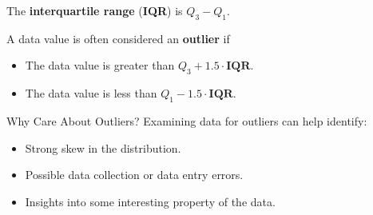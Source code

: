 \documentclass[handout]{beamer}
\begin{document}
\begin{frame}
\begin{definition}
The \textbf{interquartile range} (\textbf{IQR}) is $Q_3-Q_1$.
\end{definition}\pause

\begin{definition}
A data value is often considered an \textbf{outlier} if
\begin{itemize}
\item  The data value is greater than $Q_3 + 1.5\cdot\textbf{IQR}$.
\item  The data value is less than $Q_1 - 1.5\cdot\textbf{IQR}$.
\end{itemize}
\end{definition}\pause

\begin{block}{Why Care About Outliers?}
Examining data for outliers can help identify:
\begin{itemize}
\item Strong skew in the distribution.\pause
\item Possible data collection or data entry errors.\pause
\item Insights into some interesting property of the data.
\end{itemize}
\end{block}
\end{frame}
\end{document}
